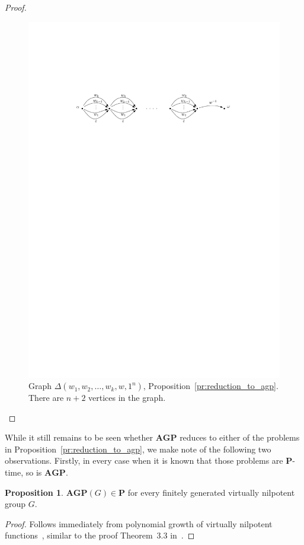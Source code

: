 \documentclass[10pt]{amsart}
\theoremstyle{definition}
\newtheorem{proposition}[theorem]{Proposition}
\def\P{{\mathbf{P}}}
\def\AGP{{\mathbf{AGP}}}
\begin{document}
\begin{proof}
\begin{figure}[h]
 \centering
 \includegraphics[width=4.5in]{bsmp}
 \caption{Graph $\Delta(w_1,w_2,\ldots,w_k,w,1^n)$, Proposition~\ref{pr:reduction_to_agp}. There are $n+2$ vertices in the graph.}\label{fi:BSMP}
\end{figure}
\end{proof}

While it still remains to be seen whether $\AGP$ reduces to either of the problems in Proposition~\ref{pr:reduction_to_agp}, we make note of the following two observations. Firstly, in every case when it is known that those problems are $\P$-time, so is $\AGP$.

\begin{proposition}\label{pr:agp_nilp}
$\AGP(G)\in\P$ for every finitely generated virtually nilpotent group $G$.
\end{proposition}
\begin{proof}
Follows immediately from polynomial growth of virtually nilpotent functions~\cite{Wolf}, similar to the proof Theorem~3.3 in~\cite{Miasnikov-Nikolaev-Ushakov:2014a}.
\end{proof}
\end{document}
